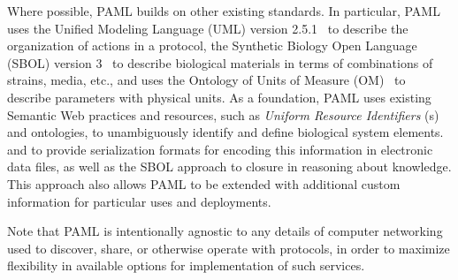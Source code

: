Where possible, PAML builds on other existing standards.
In particular, PAML uses the Unified Modeling Language (UML) version 2.5.1~\citep{uml251} to describe the organization of actions in a protocol, the Synthetic Biology Open Language (SBOL) version 3~\citep{SBOL3} to describe biological materials in terms of combinations of strains, media, etc., and uses the Ontology of Units of Measure (OM)~\citep{om2} to describe parameters with physical units.
As a foundation, PAML uses existing Semantic Web practices and resources, such as \emph{Uniform Resource Identifiers} (s) and ontologies, to unambiguously identify and define biological system elements.
and to provide serialization formats for encoding this information in electronic data files, as well as the SBOL approach to closure in reasoning about knowledge.
This approach also allows PAML to be extended with additional custom information for particular uses and deployments.

Note that PAML is intentionally agnostic to any details of computer networking used to discover, share, or otherwise operate with protocols, in order to maximize flexibility in available options for implementation of such services.
